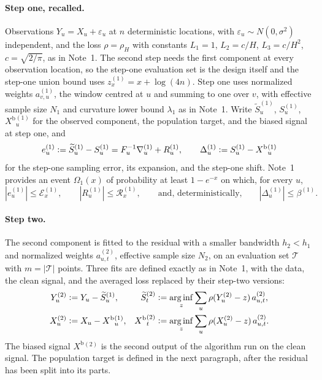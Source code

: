 \documentclass[11pt]{article}
\newcommand{\eqdef}{\mathrel{\vcentcolon=}}
\newcommand{\arginf}{\mathop{\mathrm{arg\,inf}}}
\newcommand{\rhohu}{\rho}
\newcommand{\Signal}{X}
\newcommand{\Data}{Y}
\newcommand{\IMFs}{S}
\newcommand{\IMFt}{\widetilde S}
\newcommand{\BiasedSignal}{X^{\mathrm b}}
\newcommand{\IF}{F}
\theoremstyle{definition}
\begin{document}
\paragraph{Step one, recalled.}
Observations \(\Data_u=\Signal_u+\varepsilon_u\) at \(n\) deterministic
locations, with \(\varepsilon_u\sim N(0,\sigma^2)\) independent, and the
loss \(\rho=\rho_H\) with constants
\(L_1=1\), \(L_2=c/H\), \(L_3=c/H^2\), \(c=\sqrt{2/\pi}\), as in Note~1.
The second step needs the first component at every observation location, so
the step-one evaluation set is the design itself and the step-one union
bound uses \(z^{(1)}_x=x+\log(4n)\).  Step one uses normalized weights
\(a^{(1)}_{v,u}\), the window centred at \(u\) and summing to one over
\(v\), with effective sample size \(N_1\) and curvature lower bound
\(\lambda_1\) as in Note~1.  Write
\(\IMFt^{(1)}_u\), \(\IMFs^{(1)}_u\), \(\BiasedSignal{}^{(1)}_u\) for the
observed component, the population target, and the biased signal at step
one, and
\[
  e^{(1)}_u\eqdef\IMFt^{(1)}_u-\IMFs^{(1)}_u
  =\IF_u^{-1}\nabla^{(1)}_u+R^{(1)}_u,
  \qquad
  \Delta^{(1)}_u\eqdef\IMFs^{(1)}_u-\BiasedSignal{}^{(1)}_u
\]
for the step-one sampling error, its expansion, and the step-one shift.
Note~1 provides an event \(\Omega_1(x)\) of probability at least
\(1-e^{-x}\) on which, for every \(u\),
\begin{equation}
  |e^{(1)}_u|\leq\mathcal E^{(1)}_x,\qquad
  |R^{(1)}_u|\leq\mathcal R^{(1)}_x,
  \qquad\text{and, deterministically,}\qquad
  |\Delta^{(1)}_u|\leq\beta^{(1)}.
  \label{eq:step1-recall}
\end{equation}

\paragraph{Step two.}
The second component is fitted to the residual with a smaller bandwidth
\(h_2<h_1\) and normalized weights \(a^{(2)}_{u,t}\), effective sample size
\(N_2\), on an evaluation set \(\mathcal T\) with \(m=|\mathcal T|\) points.
Three fits are defined exactly as in Note~1, with the data, the clean
signal, and the averaged loss replaced by their step-two versions:
\begin{align}
  \Data^{(2)}_u
    &\eqdef\Data_u-\IMFt^{(1)}_u,
    &
  \IMFt^{(2)}_t
    &\eqdef\arginf_z\sum_u\rhohu(\Data^{(2)}_u-z)\,a^{(2)}_{u,t},
  \label{eq:step2-observed}\\
  \Signal^{(2)}_u
    &\eqdef\Signal_u-\BiasedSignal{}^{(1)}_u,
    &
  \BiasedSignal{}^{(2)}_t
    &\eqdef\arginf_z\sum_u\rhohu(\Signal^{(2)}_u-z)\,a^{(2)}_{u,t}.
  \label{eq:step2-biased}
\end{align}
The biased signal \(\BiasedSignal{}^{(2)}\) is the second output of the
algorithm run on the clean signal.  The population target is defined in the
next paragraph, after the residual has been split into its parts.
\end{document}
